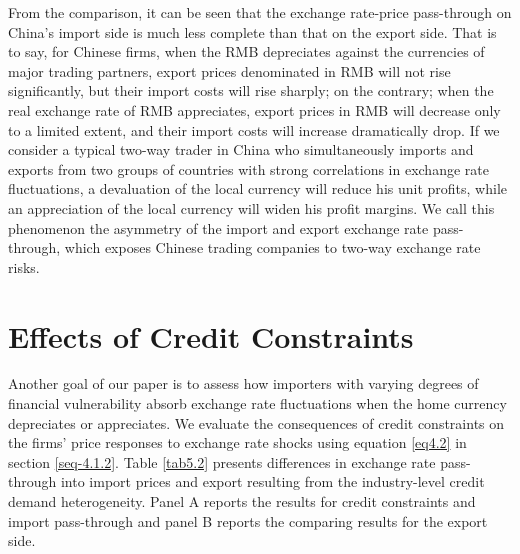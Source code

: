 From the comparison, it can be seen that the exchange rate-price pass-through on China's import side is much less complete than that on the export side. That is to say, for Chinese firms, when the RMB depreciates against the currencies of major trading partners, export prices denominated in RMB will not rise significantly, but their import costs will rise sharply; on the contrary; when the real exchange rate of RMB appreciates, export prices in RMB will decrease only to a limited extent, and their import costs will increase dramatically drop. If we consider a typical two-way trader in China who simultaneously imports and exports from two groups of countries with strong correlations in exchange rate fluctuations, a devaluation of the local currency will reduce his unit profits, while an appreciation of the local currency will widen his profit margins. We call this phenomenon the asymmetry of the import and export exchange rate pass-through, which exposes Chinese trading companies to two-way exchange rate risks.

\section{Effects of Credit Constraints}\label{sec-5.2}

Another goal of our paper is to assess how importers with varying degrees of financial vulnerability absorb exchange rate fluctuations when the home currency depreciates or appreciates. We evaluate the consequences of credit constraints on the firms' price responses to exchange rate shocks using equation \ref{eq4.2} in section \ref{seq-4.1.2}. Table \ref{tab5.2} presents differences in exchange rate pass-through into import prices and export resulting from the industry-level credit demand heterogeneity. Panel A reports the results for credit constraints and import pass-through and panel B reports the comparing results for the export side. 

